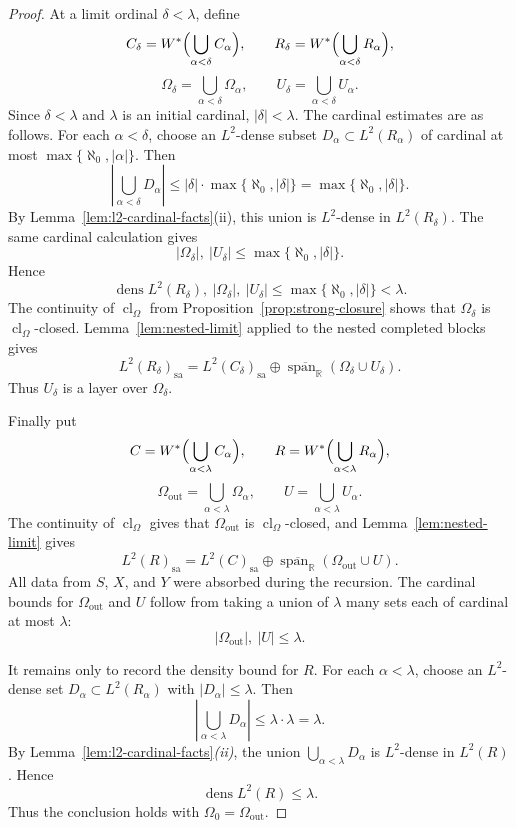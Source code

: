 \documentclass[11pt,letterpaper,reqno]{amsart}
\theoremstyle{definition}
\numberwithin{equation}{section}
\newcommand{\sa}{\mathrm{sa}}
\newcommand{\RR}{\mathbb R}
\newcommand{\cl}{\operatorname{cl}}
\DeclareMathOperator{\spanop}{span}
\DeclareMathOperator{\dens}{dens}
\begin{document}
\begin{proof}
At a limit ordinal $\delta<\lambda$, define
\[
   C_\delta=W^*\Bigl(\bigcup_{\alpha<\delta}C_\alpha\Bigr),
   \qquad
   R_\delta=W^*\Bigl(\bigcup_{\alpha<\delta}R_\alpha\Bigr),
\]
\[
   \Omega_\delta=\bigcup_{\alpha<\delta}\Omega_\alpha,
   \qquad
   U_\delta=\bigcup_{\alpha<\delta}U_\alpha.
\]
Since \(\delta<\lambda\) and \(\lambda\) is an initial cardinal,
\(|\delta|<\lambda\).  The cardinal estimates are as follows.  For each
\(\alpha<\delta\), choose an \(L^2\)-dense subset
\(D_\alpha\subset L^2(R_\alpha)\) of cardinal at most
\(\max\{\aleph_0,|\alpha|\}\).  Then
\[
   \left|\bigcup_{\alpha<\delta}D_\alpha\right|
   \leq
   |\delta|\cdot\max\{\aleph_0,|\delta|\}
   =
   \max\{\aleph_0,|\delta|\}.
\]
By Lemma~\ref{lem:l2-cardinal-facts}(ii), this union is \(L^2\)-dense in
\(L^2(R_\delta)\).  The same cardinal calculation gives
\[
   |\Omega_\delta|,\ |U_\delta|
   \leq\max\{\aleph_0,|\delta|\}.
\]
Hence
\[
   \dens L^2(R_\delta),\ |\Omega_\delta|,\ |U_\delta|
   \leq\max\{\aleph_0,|\delta|\}<\lambda.
\]
The continuity of $\cl_\Omega$ from Proposition~\ref{prop:strong-closure} shows that $\Omega_\delta$ is $\cl_\Omega$-closed.  Lemma~\ref{lem:nested-limit} applied to the nested completed blocks gives
\[
   L^2(R_\delta)_{\sa}=L^2(C_\delta)_{\sa}\oplus
   \overline{\spanop_{\RR}}(\Omega_\delta\cup U_\delta).
\]
Thus $U_\delta$ is a layer over $\Omega_\delta$.

Finally put
\[
   C=W^*\Bigl(\bigcup_{\alpha<\lambda}C_\alpha\Bigr),
   \qquad
   R=W^*\Bigl(\bigcup_{\alpha<\lambda}R_\alpha\Bigr),
\]
\[
   \Omega_{\mathrm{out}}=\bigcup_{\alpha<\lambda}\Omega_\alpha,
   \qquad
   U=\bigcup_{\alpha<\lambda}U_\alpha.
\]
The continuity of $\cl_\Omega$ gives that $\Omega_{\mathrm{out}}$ is $\cl_\Omega$-closed, and Lemma~\ref{lem:nested-limit} gives
\[
   L^2(R)_{\sa}=L^2(C)_{\sa}\oplus
   \overline{\spanop_{\RR}}(\Omega_{\mathrm{out}}\cup U).
\]
All data from $S$, $X$, and $Y$ were absorbed during the recursion.  The
cardinal bounds for \(\Omega_{\mathrm{out}}\) and \(U\) follow from taking a
union of \(\lambda\) many sets each of cardinal at most \(\lambda\):
\[
   |\Omega_{\mathrm{out}}|,\ |U|\leq \lambda .
\]

It remains only to record the density bound for \(R\).  For each
\(\alpha<\lambda\), choose an \(L^2\)-dense set
\(D_\alpha\subset L^2(R_\alpha)\) with \(|D_\alpha|\leq\lambda\).  Then
\[
   \left|\bigcup_{\alpha<\lambda}D_\alpha\right|
   \leq \lambda\cdot\lambda
   =\lambda .
\]
By Lemma~\ref{lem:l2-cardinal-facts}\emph{(ii)}, the union
\(\bigcup_{\alpha<\lambda}D_\alpha\) is \(L^2\)-dense in \(L^2(R)\).  Hence
\[
   \dens L^2(R)\leq\lambda .
\]
Thus the conclusion holds with \(\Omega_0=\Omega_{\mathrm{out}}\).
\end{proof}
\end{document}
